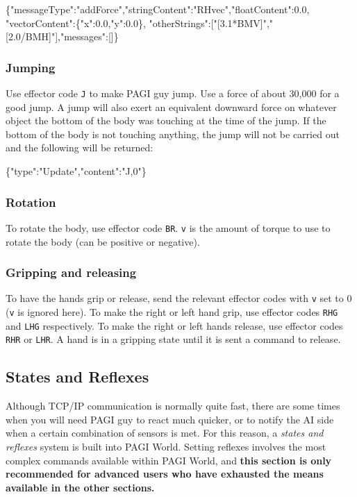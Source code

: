 \begin{center}
\scriptsize{\{"messageType":"addForce","stringContent":"RHvec","floatContent":0.0, "vectorContent":\{"x":0.0,"y":0.0\}, "otherStrings":["[3.1*BMV]","[2.0/BMH]"],"messages":[]\}}
\end{center}

\subsubsection{Jumping}

Use effector code \texttt{J} to make PAGI guy jump. Use a force of about 30,000 for a good jump. A jump will also exert an equivalent downward force on whatever object the bottom of the body was touching at the time of the jump. If the bottom of the body is not touching anything, the jump will not be carried out and the following will be returned:
\begin{center}
\scriptsize{\{"type":"Update","content":"J,0"\}} 
\end{center}

\subsubsection{Rotation}

To rotate the body, use effector code \texttt{BR}. \texttt{v} is the amount of torque to use to rotate the body (can be positive or negative).

\subsubsection{Gripping and releasing}

To have the hands grip or release, send the relevant effector codes with \texttt{v} set to 0 (\texttt{v} is ignored here). To make the right or left hand grip, use effector codes \texttt{RHG} and \texttt{LHG} respectively. To make the right or left hands release, use effector codes \texttt{RHR} or \texttt{LHR}. A hand is in a gripping state until it is sent a command to release.

\subsection{States and Reflexes}
\label{sect:statesAndReflexes}

Although TCP/IP communication is normally quite fast, there are some times when you will need PAGI guy to react much quicker, or to notify the AI side when a certain combination of sensors is met. For this reason, a \textit{states and reflexes} system is built into PAGI World. Setting reflexes involves the most complex commands available within PAGI World, and \textbf{this section is only recommended for advanced users who have exhausted the means available in the other sections.}

